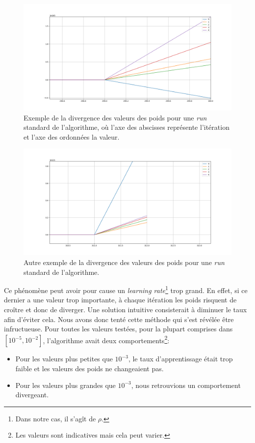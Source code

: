 \documentclass[a4paper, 11pt]{article}
\begin{document}
\begin{figure}[H]
\centering
\includegraphics[scale=0.40]{images/run_1}
\caption{Exemple de la divergence des valeurs des poids pour une \textit{run} standard de l'algorithme, où l'axe des abscisses représente l'itération et
l'axe des ordonnées la valeur.}
\label{run_1}
\end{figure}

\begin{figure}[H]
\centering
\includegraphics[scale=0.4]{images/run_2}
\caption{Autre exemple de la divergence des valeurs des poids pour une \textit{run} standard de l'algorithme.}
\label{run_2}
\end{figure}

Ce phénomène peut avoir pour cause un \textit{learning rate}\footnote{Dans notre cas, il s'agît de $\rho$.} trop grand. En effet, si ce dernier a une
valeur trop importante, à chaque itération les poids risquent de croître et donc de diverger. Une solution intuitive consisterait à diminuer le taux afin
d'éviter cela. Nous avons donc tenté cette méthode qui s'est révélée être infructueuse. Pour toutes les valeurs testées, pour la plupart comprises
dans $ [10^{-5},10^{-2}]$, l'algorithme avait deux comportements\footnote{Les valeurs sont indicatives mais cela peut varier.}:
\begin{itemize}
 \item Pour les valeurs plus petites que $10^{-3}$, le taux d'apprentissage était trop faible et les valeurs des poids ne changeaient pas.
 \item Pour les valeurs plus grandes que $10^{-3}$, nous retrouvions un comportement divergeant.
\end{itemize}
\end{document}
